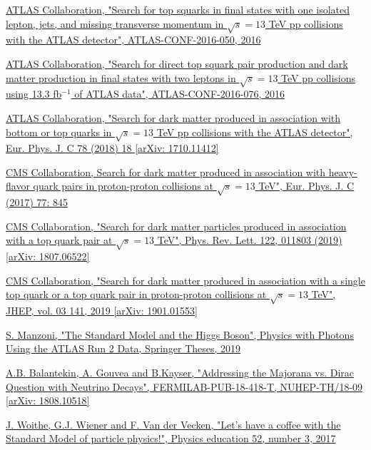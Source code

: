 \documentclass[a4paper, 10pt, openright]{report}
\begin{document}
\begin{thebibliography}{1}
\href{http://inspirehep.net/record/1480030/}{ATLAS Collaboration,
"Search for top squarks in final states with one isolated lepton, jets, and missing transverse momentum in $\sqrt{s} = 13$ TeV pp collisions with the ATLAS detector",
ATLAS-CONF-2016-050, 2016}

\href{http://inspirehep.net/record/1480056}{ATLAS Collaboration,
"Search for direct top squark pair production and dark matter production in final states with two leptons in $\sqrt{s} = 13$ TeV pp collisions using 13.3 fb$^{-1}$ of ATLAS data",
ATLAS-CONF-2016-076, 2016}

\href{https://arxiv.org/abs/1710.11412}{ATLAS Collaboration,
"Search for dark matter produced in association with bottom or top quarks in $\sqrt{s} = 13$ TeV pp collisions with the ATLAS detector",
Eur. Phys. J. C 78 (2018) 18 [arXiv: 1710.11412]}

\href{http://inspirehep.net/record/1603635}{CMS Collaboration,
Search for dark matter produced in association with heavy-flavor quark pairs in proton-proton collisions at $\sqrt{s} = 13$ TeV",
Eur. Phys. J. C (2017) 77: 845}

\href{https://arxiv.org/abs/1807.06522}{CMS Collaboration,
"Search for dark matter particles produced in association with a top quark pair at $\sqrt{s} = 13$ TeV",
Phys. Rev. Lett. 122, 011803 (2019) [arXiv: 1807.06522]}

\href{https://arxiv.org/abs/1901.01553}{CMS Collaboration,
"Search for dark matter produced in association with a single top quark or a top quark pair in proton-proton collisions at $\sqrt{s} = 13$ TeV",
JHEP, vol. 03 141, 2019 [arXiv: 1901.01553]}

\href{https://link.springer.com/chapter/10.1007/978-3-030-24370-8_2#citeas}{S. Manzoni, 
"The Standard Model and the Higgs Boson",
Physics with Photons Using the ATLAS Run 2 Data, Springer Theses, 2019
}

\href{https://arxiv.org/abs/1808.10518}{A.B. Balantekin, A. Gouvea and B.Kayser,
"Addressing the Majorana vs. Dirac Question with Neutrino Decays",
FERMILAB-PUB-18-418-T, NUHEP-TH/18-09 [arXiv: 1808.10518]
}

\href{https://arxiv.org/abs/1808.10518}{J. Woithe, G.J. Wiener and F. Van der Vecken,
"Let's have a coffee with the Standard Model of particle physics!",
Physics education 52, number 3, 2017
}


\end{thebibliography}
\end{document}
